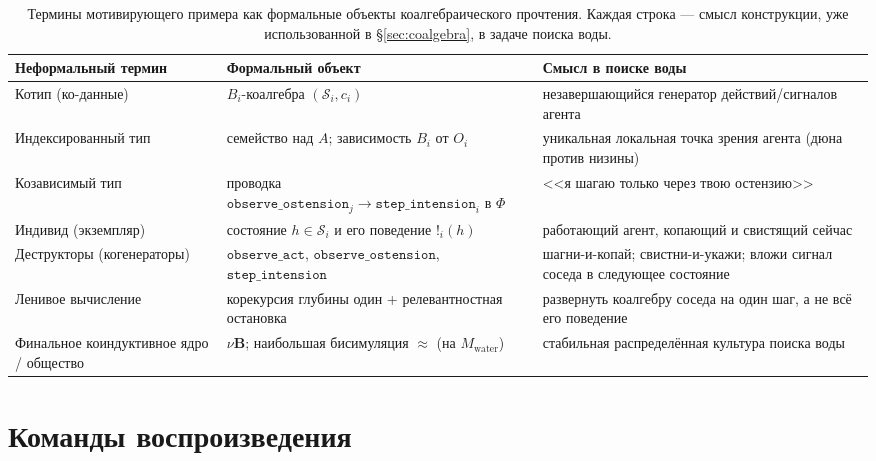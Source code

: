 \documentclass{article}
\newcommand{\method}[1]{\texttt{#1}}
\begin{document}
\begin{table}[t]
\caption{Термины мотивирующего примера как формальные объекты
коалгебраического прочтения. Каждая строка --- смысл конструкции, уже
использованной в \S\ref{sec:coalgebra}, в задаче поиска воды.}
\label{tab:coalg-dictionary}
\centering
\small
\begin{tabular}{p{2.9cm} p{4.3cm} p{4.4cm}}
\toprule
Неформальный термин & Формальный объект & Смысл в поиске воды \\
\midrule
Котип (ко-данные) & $B_i$-коалгебра $(\mathcal{S}_i,c_i)$ & незавершающийся генератор действий/сигналов агента \\
Индексированный тип & семейство над $A$; зависимость $B_i$ от $O_i$ & уникальная локальная точка зрения агента (дюна против низины) \\
Козависимый тип & проводка $\method{observe\_ostension}_j\!\to\!\method{step\_intension}_i$ в $\Phi$ & <<я шагаю только через твою остензию>> \\
Индивид (экземпляр) & состояние $h\in\mathcal{S}_i$ и его поведение $!_i(h)$ & работающий агент, копающий и свистящий сейчас \\
Деструкторы (когенераторы) & $\method{observe\_act}$, $\method{observe\_ostension}$, $\method{step\_intension}$ & шагни-и-копай; свистни-и-укажи; вложи сигнал соседа в следующее состояние \\
Ленивое вычисление & корекурсия глубины один + релевантностная остановка & развернуть коалгебру соседа на один шаг, а не всё его поведение \\
Финальное коиндуктивное ядро / общество & $\nu\mathbf{B}$; наибольшая бисимуляция $\approx$ (на $M_{\mathrm{water}}$) & стабильная распределённая культура поиска воды \\
\bottomrule
\end{tabular}
\end{table}


\section{Команды воспроизведения}
\label{app:repro}
\end{document}
